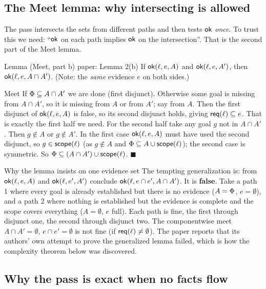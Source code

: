 \subsection{The Meet lemma: why intersecting is allowed}

The pass intersects the sets from different paths and then tests $\mathsf{ok}$ \emph{once}. To trust this we need: ``$\mathsf{ok}$ on each path implies $\mathsf{ok}$ on the intersection''. That is the second part of the Meet lemma.

\begin{statement}{Lemma (Meet, part b) \hfill\normalfont paper: Lemma 2(b)}
If $\mathsf{ok}(\ell,e,A)$ and $\mathsf{ok}(\ell,e,A')$, then $\mathsf{ok}(\ell,e,A\cap A')$. (Note: the \emph{same} evidence $e$ on both sides.)
\end{statement}

\begin{plainproof}{Meet}
If $\Phi\subseteq A\cap A'$ we are done (first disjunct). Otherwise some goal is missing from $A\cap A'$, so it is missing from $A$ or from $A'$; say from $A$. Then the first disjunct of $\mathsf{ok}(\ell,e,A)$ is false, so its second disjunct holds, giving $\mathsf{req}(\ell)\subseteq e$. That is exactly the first half we need. For the second half take any goal $g$ not in $A\cap A'$. Then $g\notin A$ or $g\notin A'$. In the first case $\mathsf{ok}(\ell,e,A)$ must have used the second disjunct, so $g\in\mathsf{scope}(\ell)$ (as $g\notin A$ and $\Phi\subseteq A\cup\mathsf{scope}(\ell)$); the second case is symmetric. So $\Phi\subseteq (A\cap A')\cup\mathsf{scope}(\ell)$. \hfill$\blacksquare$
\end{plainproof}

\begin{warning}{Why the lemma insists on one evidence set}
The tempting generalization is: from $\mathsf{ok}(\ell,e,A)$ and $\mathsf{ok}(\ell,e',A')$ conclude $\mathsf{ok}(\ell,e\cap e',A\cap A')$. It is \textbf{false}. Take a path 1 where every goal is already established but there is no evidence ($A=\Phi$, $e=\emptyset$), and a path 2 where nothing is established but the evidence is complete and the scope covers everything ($A=\emptyset$, $e$ full). Each path is fine, the first through disjunct one, the second through disjunct two. The componentwise meet $A\cap A'=\emptyset$, $e\cap e'=\emptyset$ is not fine (if $\mathsf{req}(\ell)\ne\emptyset$). The paper reports that its authors' own attempt to prove the generalized lemma failed, which is how the complexity theorem below was discovered.
\end{warning}

\subsection{Why the pass is exact when no facts flow}

